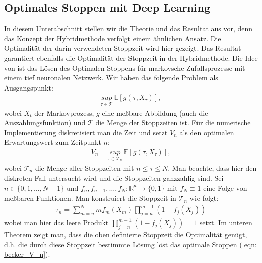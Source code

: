 \documentclass[12pt,titlepage,headsepline]{article}
\begin{document}
      \subsection{Optimales Stoppen mit Deep Learning}
      In diesem Unterabschnitt stellen wir die Theorie und das Resultat aus \cite{becker_deep_2019} vor, denn das Konzept der Hybridmethode verfolgt einem ähnlichen Ansatz. Die Optimalität der darin verwendeten Stoppzeit wird hier gezeigt. Das Resultat garantiert ebenfalls die Optimalität der Stoppzeit in der Hybridmethode.
      \hfill\break
      Die Idee von \cite{becker_deep_2019} ist das Lösen des Optimalen Stoppens für markovsche Zufallsprozesse mit einem tief neuronalen Netzwerk. Wir haben das folgende Problem als Ausgangspunkt:
      \begin{align*}
        \underset{\tau \in \mathcal{T}}{sup} \ \mathbb{E}[g(\tau,X_{\tau})],
      \end{align*}
      wobei $X_t$ der Markovprozess, $g$ eine meßbare Abbildung (auch die Auszahlungsfunktion) und $\mathcal{T}$ die Menge der Stoppzeiten ist. Für die numerische Implementierung diskretisiert man die Zeit und setzt $V_n$ als den optimalen Erwartungswert zum Zeitpunkt $n$:
      \begin{align}\label{eqn: becker_V_n}
        V_n = \underset{\tau \in \mathcal{T}_n}{sup} \ \mathbb{E}[g(\tau,X_{\tau})],
      \end{align}
      wobei $\mathcal{T}_n $ die Menge aller Stoppzeiten mit $n \leq \tau \leq N$. Man beachte, dass hier den diskreten Fall untersucht wird und die Stoppzeiten ganzzahlig sind.
      \hfill\break
      Sei $n \in \{ 0,1,\ldots,N-1 \}$ und $f_n,f_{n+1},\ldots,f_N:\mathbb{R}^d \rightarrow \{0,1\}$ mit $f_N \equiv 1 $ eine Folge von meßbaren Funktionen. Man konstruiert die Stoppzeit in $\mathcal{T}_n$ wie folgt:
      \begin{align}\label{eqn: becker_stoppzeit}
        \tau_n = \sum_{m=n}^N mf_m(X_m)\prod_{j=n}^{m-1}(1-f_j(X_j))
      \end{align}
      wobei man hier das leere Produkt $\prod_{j=n}^{m-1}(1-f_j(X_j)) = 1$ setzt.
      \hfill\break
      Im unteren Theorem zeigt man, dass die oben definierte Stoppzeit die Optimalität genügt, d.h. die durch diese Stoppzeit bestimmte Lösung löst das optimale Stoppen (\ref{eqn: becker_V_n}).
\end{document}
